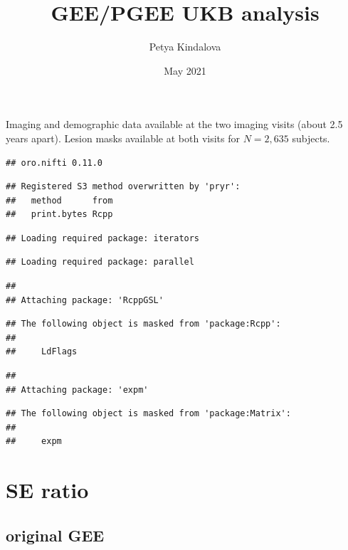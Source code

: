 \documentclass[]{article}
\title{GEE/PGEE UKB analysis}
\author{Petya Kindalova}
\date{May 2021}
\begin{document}
\maketitle

{
\setcounter{tocdepth}{2}
\tableofcontents
}
Imaging and demographic data available at the two imaging visits (about
2.5 years apart). Lesion masks available at both visits for \(N=2,635\)
subjects.

\begin{verbatim}
## oro.nifti 0.11.0
\end{verbatim}

\begin{verbatim}
## Registered S3 method overwritten by 'pryr':
##   method      from
##   print.bytes Rcpp
\end{verbatim}

\begin{verbatim}
## Loading required package: iterators
\end{verbatim}

\begin{verbatim}
## Loading required package: parallel
\end{verbatim}

\begin{verbatim}
## 
## Attaching package: 'RcppGSL'
\end{verbatim}

\begin{verbatim}
## The following object is masked from 'package:Rcpp':
## 
##     LdFlags
\end{verbatim}

\begin{verbatim}
## 
## Attaching package: 'expm'
\end{verbatim}

\begin{verbatim}
## The following object is masked from 'package:Matrix':
## 
##     expm
\end{verbatim}

\hypertarget{se-ratio}{%
\section{SE ratio}\label{se-ratio}}

\hypertarget{original-gee}{%
\subsection{original GEE}\label{original-gee}}
\end{document}
